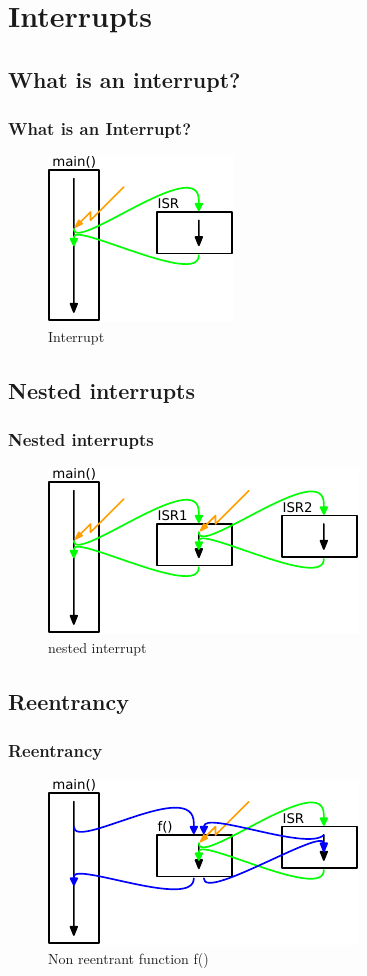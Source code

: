 \section{Interrupts}
\subsection*{What is an interrupt? }
\begin{frame}
    \frametitle{What is an Interrupt? }
    \begin{figure}
        \includegraphics[height=0.4\textheight]{fig/interrupt.pdf}
        \caption{Interrupt}
    \end{figure}
\end{frame}

\subsection*{Nested interrupts}
\begin{frame}
    \frametitle{Nested interrupts}
    \begin{figure}
        \includegraphics[height=0.4\textheight]{fig/interrupt_nested.pdf}
        \caption{nested interrupt}
    \end{figure}
\end{frame}

\subsection*{Reentrancy}
\begin{frame}
    \frametitle{Reentrancy}
    \begin{figure}
        \includegraphics[height=0.4\textheight]{fig/interrupt_reentrancy.pdf}
        \caption{Non reentrant function f()}
    \end{figure}
\end{frame}

